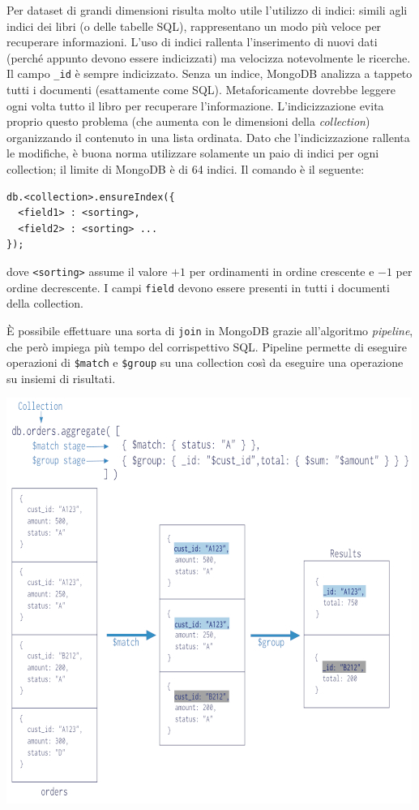 \documentclass[a4page, 11pt]{article}
\begin{document}
Per dataset di grandi dimensioni risulta molto utile l'utilizzo di indici: simili agli indici dei libri (o delle tabelle SQL), rappresentano un modo più veloce per recuperare informazioni.
L'uso di indici rallenta l'inserimento di nuovi dati (perché appunto devono essere indicizzati) ma velocizza notevolmente le ricerche. Il campo \texttt{\_id} è sempre indicizzato.
Senza un indice, MongoDB analizza a tappeto tutti i documenti (esattamente come SQL). Metaforicamente dovrebbe leggere ogni volta tutto il libro per recuperare l'informazione.
L'indicizzazione evita proprio questo problema (che aumenta con le dimensioni della \textit{collection}) organizzando il contenuto in una lista ordinata.
Dato che l'indicizzazione rallenta le modifiche, è buona norma utilizzare solamente un paio di indici per ogni collection; il limite di MongoDB è di 64 indici.
Il comando è il seguente:
\begin{verbatim}
db.<collection>.ensureIndex({
  <field1> : <sorting>,
  <field2> : <sorting> ...
});
\end{verbatim}
dove \texttt{<sorting>} assume il valore $+1$ per ordinamenti in ordine crescente e $-1$ per ordine decrescente. I campi \texttt{field} devono essere presenti in tutti i documenti della collection.

È possibile effettuare una sorta di \texttt{join} in MongoDB grazie all'algoritmo \textit{pipeline}\cite{NoSQLDB}, che però impiega più tempo del corrispettivo SQL.
Pipeline permette di eseguire operazioni di \texttt{\$match} e \texttt{\$group} su una collection così da eseguire una operazione su insiemi di risultati.
\begin{center}
  \includegraphics[scale=0.6]{mongodb-pipeline.jpg}
\end{center}
\end{document}
